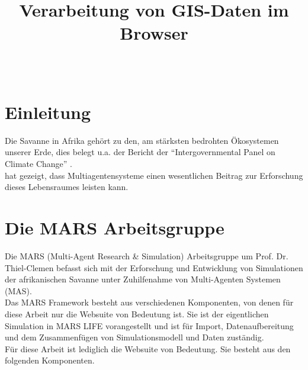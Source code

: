 \documentclass[10pt,conference,compsocconf]{IEEEtran}
\begin{document}
	\title{\textbf{\Large Verarbeitung von GIS-Daten im Browser}\\[0.2ex]}
	
	\author{
		\\
	}
	
\maketitle

\IEEEpeerreviewmaketitle



\section{Einleitung}
Die Savanne in Afrika gehört zu den, am stärksten bedrohten Ökosystemen unserer Erde, dies belegt u.a. der Bericht der \enquote{Intergovernmental Panel on Climate Change} \cite{climateReport}.\\
\cite{LUDAS} hat gezeigt, dass Multiagentensysteme einen wesentlichen Beitrag zur Erforschung dieses Lebensraumes leisten kann. \\



\section{Die MARS Arbeitsgruppe}
Die MARS (Multi-Agent Research \& Simulation) Arbeitsgruppe um Prof. Dr. Thiel-Clemen befasst sich mit der Erforschung und Entwicklung von Simulationen der afrikanischen Savanne unter Zuhilfenahme von Multi-Agenten Systemen (MAS). \\
Das MARS Framework besteht aus verschiedenen Komponenten, von denen für diese Arbeit nur die Websuite von Bedeutung ist. Sie ist der eigentlichen Simulation in MARS LIFE vorangestellt und ist für Import, Datenaufbereitung und dem Zusammenfügen von Simulationsmodell und Daten zuständig. \\
Für diese Arbeit ist lediglich die Websuite von Bedeutung. Sie besteht aus den folgenden Komponenten. \\
\end{document}
